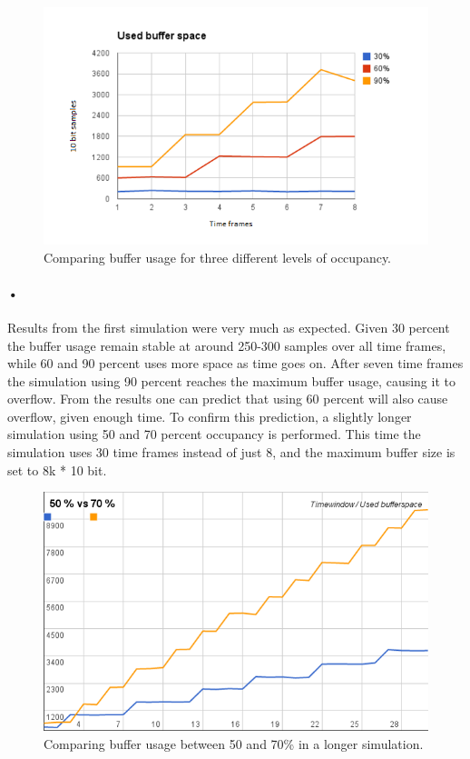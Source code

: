 \documentclass[a4paper, 12pt]{report}
\begin{document}
\begin{figure}[h!]
	\centering
		\includegraphics[width=1.0\textwidth]{images/results-flat30-60-80-8tf.png}
		\caption{Comparing buffer usage for three different levels of occupancy.}
		\label{fig:results-30-60-90}
\end{figure}

\paragraph{•} %
Results from the first simulation were very much as expected.
Given 30 percent the buffer usage remain stable at around 250-300 samples over all time frames, while 60 and 90 percent uses more space as time goes on.
After seven time frames the simulation using 90 percent reaches the maximum buffer usage, causing it to overflow.
From the results one can predict that using 60 percent will also cause overflow, given enough time.
To confirm this prediction, a slightly longer simulation using 50 and 70 percent occupancy is performed.
This time the simulation uses 30 time frames instead of just 8, and the maximum buffer size is set to 8k * 10 bit.

\begin{figure}[h!]
	\centering
		\includegraphics[width=1.0\textwidth]{images/50v70.png}
		\caption{Comparing buffer usage between 50 and 70\% in a longer simulation.}
		\label{fig:results-50-70}
\end{figure}
\end{document}
